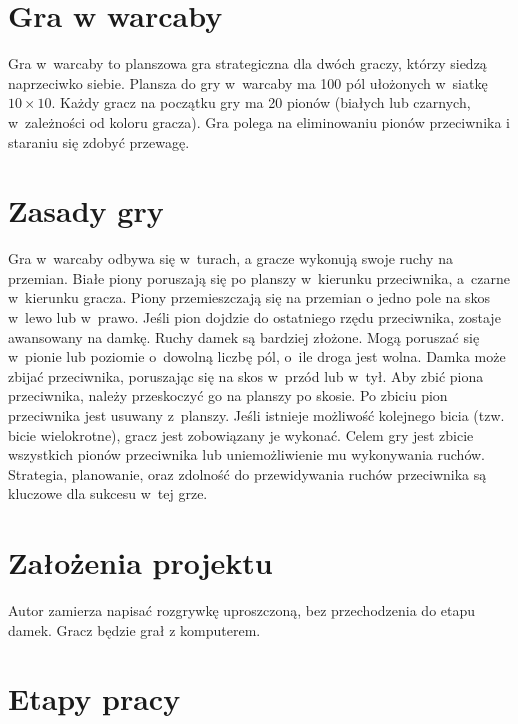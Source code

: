 \documentclass[12pt,twoside,a4paper]{article}
\begin{document}
\section{Gra w warcaby}
Gra w~warcaby to planszowa gra strategiczna dla dwóch graczy, którzy siedzą naprzeciwko siebie. 
Plansza do gry w~warcaby ma 100 pól ułożonych w~siatkę $10\times 10$.
Każdy gracz na początku gry ma 20 pionów (białych lub czarnych, w~zależności od koloru gracza).
Gra polega na eliminowaniu pionów przeciwnika i staraniu się zdobyć przewagę.

\section{Zasady gry}

Gra w~warcaby odbywa się w~turach, a gracze wykonują swoje ruchy na przemian.
Białe piony poruszają się po planszy w~kierunku przeciwnika, a~czarne w~kierunku gracza.
Piony przemieszczają się na przemian o jedno pole na skos w~lewo lub w~prawo.
Jeśli pion dojdzie do ostatniego rzędu przeciwnika, zostaje awansowany na damkę.
Ruchy damek są bardziej złożone. Mogą poruszać się w~pionie lub poziomie o~dowolną liczbę pól,
o~ile droga jest wolna.
Damka może zbijać przeciwnika, poruszając się na skos w~przód lub w~tył.
Aby zbić piona przeciwnika, należy przeskoczyć go na planszy po skosie.
Po zbiciu pion przeciwnika jest usuwany z~planszy.
Jeśli istnieje możliwość kolejnego bicia (tzw. bicie wielokrotne), gracz jest zobowiązany je wykonać.
Celem gry jest zbicie wszystkich pionów przeciwnika lub uniemożliwienie mu wykonywania ruchów.
Strategia, planowanie, oraz zdolność do przewidywania ruchów przeciwnika są kluczowe dla sukcesu w~tej grze.

\section{Założenia projektu}

Autor zamierza napisać rozgrywkę uproszczoną, bez przechodzenia do etapu damek. Gracz będzie grał z komputerem.

\section{Etapy pracy}
\end{document}
